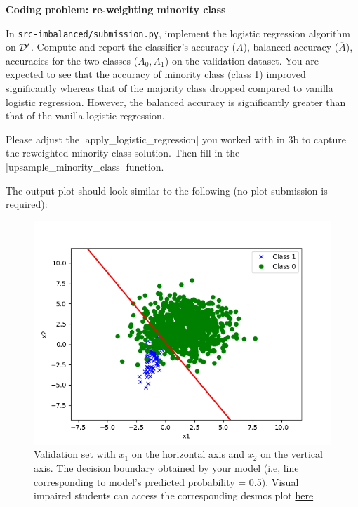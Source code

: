 \item {} \textbf{Coding problem: re-weighting minority class}

In \texttt{src-imbalanced/submission.py}, implement the logistic regression algorithm on $\mathcal{D}'$.  Compute and report the classifier's accuracy ($A$), balanced accuracy ($\overline{A}$), accuracies for the two classes ($A_0, A_1$) on the validation dataset. You are expected to see that the accuracy of minority class (class 1) improved significantly whereas that of the majority class dropped compared to vanilla logistic regression. However, the balanced accuracy is significantly greater than that of the vanilla logistic regression. 

Please adjust the |apply_logistic_regression| you worked with in 3b to capture the reweighted minority class solution. 
Then fill in the |upsample_minority_class| function. 

The output plot should look similar to the following (no plot submission is required):

\begin{figure}[H]
	\centering
	\vspace{2mm}
	\includegraphics[width=0.5\linewidth]{03-imbalanced/imbalanced_upsampling_pred.png}
	  \caption{Validation set with $x_1$ on the horizontal axis and $x_2$ on
	  the vertical axis. The decision boundary obtained by your model (i.e, line corresponding to model's predicted probability = 0.5). Visual impaired students can access the corresponding desmos plot \href{https://www.desmos.com/calculator/yzewr1djk7}{here}}
  \end{figure}